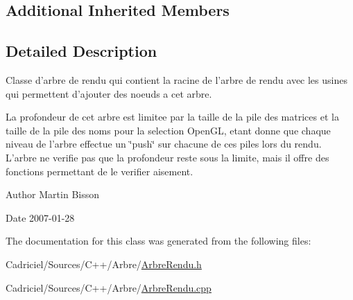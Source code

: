 \subsection*{Additional Inherited Members}


\subsection{Detailed Description}
Classe d'arbre de rendu qui contient la racine de l'arbre de rendu avec les usines qui permettent d'ajouter des noeuds a cet arbre. 

La profondeur de cet arbre est limitee par la taille de la pile des matrices et la taille de la pile des noms pour la selection Open\-G\-L, etant donne que chaque niveau de l'arbre effectue un \char`\"{}push\char`\"{} sur chacune de ces piles lors du rendu. L'arbre ne verifie pas que la profondeur reste sous la limite, mais il offre des fonctions permettant de le verifier aisement.

\begin{DoxyAuthor}{Author}
Martin Bisson 
\end{DoxyAuthor}
\begin{DoxyDate}{Date}
2007-\/01-\/28 
\end{DoxyDate}


The documentation for this class was generated from the following files\-:\begin{DoxyCompactItemize}
\item 
Cadriciel/\-Sources/\-C++/\-Arbre/\hyperlink{_arbre_rendu_8h}{Arbre\-Rendu.\-h}\item 
Cadriciel/\-Sources/\-C++/\-Arbre/\hyperlink{_arbre_rendu_8cpp}{Arbre\-Rendu.\-cpp}\end{DoxyCompactItemize}
